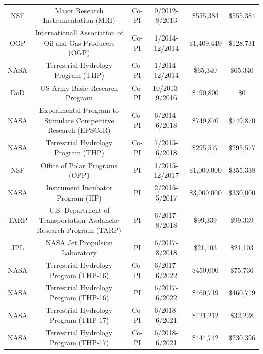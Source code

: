 \documentclass[11pt]{article}
\begin{document}
\begin{table}[!htbp]
\begin{tabular}{cccccc}
NSF              & Major Research Instrumentation (MRI)                                    & Co-PI & 9/2012-8/2013    & \$555,384    & \$555,384  \\
OGP              & Internationall Association of Oil and Gas Producers (OGP)               & Co-PI & 1/2014-12/2014   & \$1,409,449  & \$128,731 \\
NASA             & Terrestrial Hydrology Program (THP)                                     & Co-PI & 1/2014-12/2014   & \$65,340     & \$65,340 \\
DoD              & US Army Basic Research Program                                          & Co-PI & 10/2013-9/2016   & \$490,800    & \$0  \\
NASA             & Experimental Program to Stimulate Compeititve Research (EPSCoR)         & Co-PI & 6/2014-6/2018    & \$749,870    & \$749,870   \\
NASA             & Terrestrial Hydrology Program (THP)                                     & Co-PI & 7/2015-6/2018    & \$295,577    & \$295,577  \\
NSF              & Office of Polar Programs (OPP)                                          & PI    & 1/2015-12/2017   & \$1,000,000  & \$355,338  \\
NASA             & Instrument Incubator Program (IIP)                                      & PI    & 2/2015-5/2017    & \$3,000,000  & \$330,000  \\
TARP             & U.S. Department of Transportation Avalanche Research Program (TARP)     & PI    & 6/2017-8/2018    & \$99,339     & \$99,339 \\
JPL              & NASA Jet Propulsion Laboratory                                          & PI    & 6/2017-8/2018    & \$21,103     & \$21,103  \\
NASA             & Terrestrial Hydrology Program (THP-16)                                  & Co-PI & 6/2017-6/2022    & \$450,000    & \$75,736 \\
NASA             & Terrestrial Hydrology Program (THP-16)                                  & PI    & 6/2017-6/2022    & \$460,719    & \$460,719 \\
NASA             & Terrestrial Hydrology Program (THP-17)                                  & Co-PI & 6/2018-6/2021    & \$421,212    & \$32,228  \\
NASA             & Terrestrial Hydrology Program (THP-17)                                  & Co-PI & 6/2018-6/2021    & \$444,742    & \$230,396  \\

\end{tabular}
\end{table}
\end{document}
